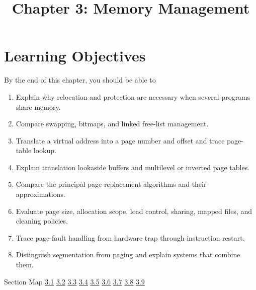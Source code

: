 \documentclass[10pt,letterpaper]{article}
\title{Chapter 3: Memory Management}
\author{}
\date{}
\begin{document}
\maketitle
\section*{Learning Objectives}
\begin{studybox}{By the end of this chapter, you should be able to}
\begin{enumerate}
  \item Explain why relocation and protection are necessary when several programs share memory.
  \item Compare swapping, bitmaps, and linked free-list management.
  \item Translate a virtual address into a page number and offset and trace page-table lookup.
  \item Explain translation lookaside buffers and multilevel or inverted page tables.
  \item Compare the principal page-replacement algorithms and their approximations.
  \item Evaluate page size, allocation scope, load control, sharing, mapped files, and cleaning policies.
  \item Trace page-fault handling from hardware trap through instruction restart.
  \item Distinguish segmentation from paging and explain systems that combine them.
\end{enumerate}
\end{studybox}

\begin{studybox}{Section Map}
\hyperlink{sec-3-1}{3.1} \quad \hyperlink{sec-3-2}{3.2} \quad \hyperlink{sec-3-3}{3.3} \quad \hyperlink{sec-3-4}{3.4} \quad \hyperlink{sec-3-5}{3.5} \quad \hyperlink{sec-3-6}{3.6} \quad \hyperlink{sec-3-7}{3.7} \quad \hyperlink{sec-3-8}{3.8} \quad \hyperlink{sec-3-9}{3.9}
\end{studybox}
\end{document}
